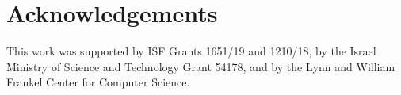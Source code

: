 \documentclass[letterpaper]{article}
\begin{document}










\section{Acknowledgements}
This work was supported by ISF Grants 1651/19 and 1210/18, by the Israel Ministry of Science and Technology Grant 54178, and by the Lynn and William Frankel Center for Computer Science.

%
\clearpage

\end{document}
